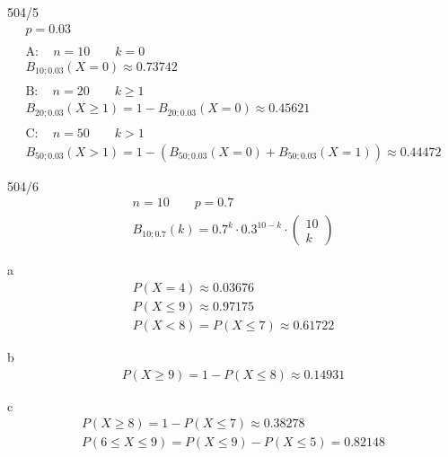 \begin{exercise}{504/5}
  \begin{gather*}
    p = 0.03 \\\\
    \text{A} \colon \quad n = 10 \qquad k = 0 \\
    B_{10;0.03}(X = 0) \approx 0.73742 \\\\
    \text{B} \colon \quad n = 20 \qquad k \geq 1 \\
    B_{20;0.03}(X \geq 1) = 1 - B_{20;0.03}(X = 0) \approx 0.45621 \\\\
    \text{C} \colon \quad n = 50 \qquad k > 1 \\
    B_{50;0.03}(X > 1) = 1 - (B_{50;0.03}(X = 0) + B_{50;0.03}(X = 1)) \approx 0.44472
  \end{gather*}
\end{exercise}
\begin{exercise}{504/6}
  \begin{gather*}
    n = 10 \qquad p = 0.7 \\
    B_{10;0.7}(k) = 0.7^k \cdot 0.3^{10 - k} \cdot \begin{pmatrix}10 \\ k\end{pmatrix}
  \end{gather*}
  \item [a]
  \begin{gather*}
    P(X = 4) \approx 0.03676 \\
    P(X \leq 9) \approx 0.97175 \\
    P(X < 8) = P(X \leq 7) \approx 0.61722
  \end{gather*}
  \item [b]
  \begin{gather*}
    P(X \geq 9) = 1 - P(X \leq 8) \approx 0.14931
  \end{gather*}
  \item [c]
  \begin{gather*}
    P(X \geq 8) = 1 - P(X \leq 7) \approx 0.38278 \\
    P(6 \leq X \leq 9) = P(X \leq 9) - P(X \leq 5) = 0.82148
  \end{gather*}
\end{exercise}
